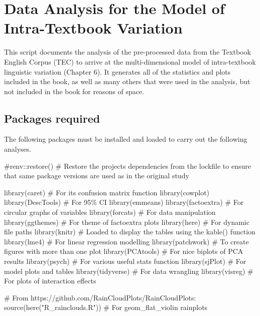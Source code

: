\documentclass[
  letterpaper,
  DIV=11,
  numbers=noendperiod]{scrreprt}
\newenvironment{Shaded}{\begin{snugshade}}{\end{snugshade}}
\newcommand{\CommentTok}[1]{\textcolor[rgb]{0.37,0.37,0.37}{#1}}
\newcommand{\FunctionTok}[1]{\textcolor[rgb]{0.28,0.35,0.67}{#1}}
\newcommand{\NormalTok}[1]{\textcolor[rgb]{0.00,0.23,0.31}{#1}}
\newcommand{\StringTok}[1]{\textcolor[rgb]{0.13,0.47,0.30}{#1}}
\begin{document}
\chapter{Data Analysis for the Model of Intra-Textbook
Variation}\label{data-analysis-for-the-model-of-intra-textbook-variation}

This script documents the analysis of the pre-processed data from the
Textbook English Corpus (TEC) to arrive at the multi-dimensional model
of intra-textbook linguistic variation (Chapter 6). It generates all of
the statistics and plots included in the book, as well as many others
that were used in the analysis, but not included in the book for reasons
of space.

\section{Packages required}\label{packages-required-1}

The following packages must be installed and loaded to carry out the
following analyses.

\begin{Shaded}
\begin{Highlighting}[]
\CommentTok{\#renv::restore() \# Restore the project\textquotesingle{}s dependencies from the lockfile to ensure that same package versions are used as in the original study}

\FunctionTok{library}\NormalTok{(caret) }\CommentTok{\# For its confusion matrix function}
\FunctionTok{library}\NormalTok{(cowplot)}
\FunctionTok{library}\NormalTok{(DescTools) }\CommentTok{\# For 95\% CI}
\FunctionTok{library}\NormalTok{(emmeans)}
\FunctionTok{library}\NormalTok{(factoextra) }\CommentTok{\# For circular graphs of variables}
\FunctionTok{library}\NormalTok{(forcats) }\CommentTok{\# For data manipulation}
\FunctionTok{library}\NormalTok{(ggthemes) }\CommentTok{\# For theme of factoextra plots}
\FunctionTok{library}\NormalTok{(here) }\CommentTok{\# For dynamic file paths}
\FunctionTok{library}\NormalTok{(knitr) }\CommentTok{\# Loaded to display the tables using the kable() function}
\FunctionTok{library}\NormalTok{(lme4) }\CommentTok{\# For linear regression modelling}
\FunctionTok{library}\NormalTok{(patchwork) }\CommentTok{\# To create figures with more than one plot}
\FunctionTok{library}\NormalTok{(PCAtools) }\CommentTok{\# For nice biplots of PCA results}
\FunctionTok{library}\NormalTok{(psych) }\CommentTok{\# For various useful stats function}
\FunctionTok{library}\NormalTok{(sjPlot) }\CommentTok{\# For model plots and tables}
\FunctionTok{library}\NormalTok{(tidyverse) }\CommentTok{\# For data wrangling}
\FunctionTok{library}\NormalTok{(visreg) }\CommentTok{\# For plots of interaction effects}

\CommentTok{\# From https://github.com/RainCloudPlots/RainCloudPlots:}
\FunctionTok{source}\NormalTok{(}\FunctionTok{here}\NormalTok{(}\StringTok{"R\_rainclouds.R"}\NormalTok{)) }\CommentTok{\# For geom\_flat\_violin rainplots}
\end{Highlighting}
\end{Shaded}
\end{document}
